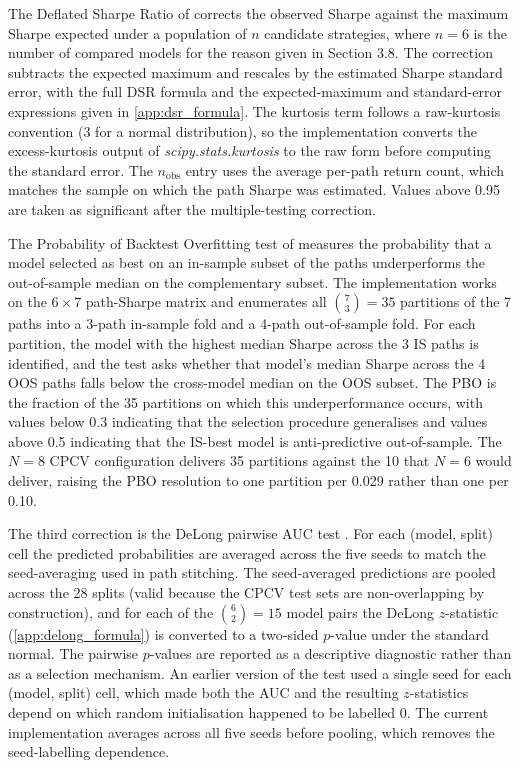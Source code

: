 \documentclass[12pt,a4paper,oneside]{article}
\begin{document}
The Deflated Sharpe Ratio of \citet[Chapter 11]{lopez_de_prado_2018} corrects the observed Sharpe against the maximum Sharpe expected under a population of $n$ candidate strategies, where $n = 6$ is the number of compared models for the reason given in Section 3.8. The correction subtracts the expected maximum and rescales by the estimated Sharpe standard error, with the full DSR formula and the expected-maximum and standard-error expressions given in \label{ref:dsr_formula_call}\autoref{app:dsr_formula}. The kurtosis term follows a raw-kurtosis convention (3 for a normal distribution), so the implementation converts the excess-kurtosis output of \textit{scipy.stats.kurtosis} to the raw form before computing the standard error. The $n_{\text{obs}}$ entry uses the average per-path return count, which matches the sample on which the path Sharpe was estimated. Values above 0.95 are taken as significant after the multiple-testing correction.

The Probability of Backtest Overfitting test of \citet[Chapter 14]{lopez_de_prado_2018} measures the probability that a model selected as best on an in-sample subset of the paths underperforms the out-of-sample median on the complementary subset. The implementation works on the $6 \times 7$ path-Sharpe matrix and enumerates all $\binom{7}{3} = 35$ partitions of the 7 paths into a 3-path in-sample fold and a 4-path out-of-sample fold. For each partition, the model with the highest median Sharpe across the 3 IS paths is identified, and the test asks whether that model's median Sharpe across the 4 OOS paths falls below the cross-model median on the OOS subset. The PBO is the fraction of the 35 partitions on which this underperformance occurs, with values below 0.3 indicating that the selection procedure generalises and values above 0.5 indicating that the IS-best model is anti-predictive out-of-sample. The $N = 8$ CPCV configuration delivers 35 partitions against the 10 that $N = 6$ would deliver, raising the PBO resolution to one partition per 0.029 rather than one per 0.10.

The third correction is the DeLong pairwise AUC test \citep{delong_1988}. For each (model, split) cell the predicted probabilities are averaged across the five seeds to match the seed-averaging used in path stitching. The seed-averaged predictions are pooled across the 28 splits (valid because the CPCV test sets are non-overlapping by construction), and for each of the $\binom{6}{2} = 15$ model pairs the DeLong $z$-statistic (\label{ref:delong_formula_call}\autoref{app:delong_formula}) is converted to a two-sided $p$-value under the standard normal. The pairwise $p$-values are reported as a descriptive diagnostic rather than as a selection mechanism. An earlier version of the test used a single seed for each (model, split) cell, which made both the AUC and the resulting $z$-statistics depend on which random initialisation happened to be labelled 0. The current implementation averages across all five seeds before pooling, which removes the seed-labelling dependence.
\end{document}
